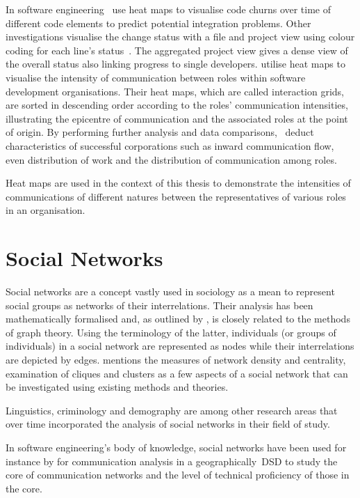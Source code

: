 In software engineering~\citet{feldt2013heatmaps} use heat maps to visualise code churns over time of different code elements to predict potential integration problems. Other investigations visualise the change status with a file and project view using colour coding for each line's status~\citep{voinea2007visualassessment}. The aggregated project view gives a dense view of the overall status also linking progress to single developers.
\citet{coplien1996patternsofprod} utilise heat maps to visualise the intensity of communication between roles within software development organisations. Their heat maps, which are called interaction grids, are sorted in descending order according to the roles' communication intensities, illustrating the epicentre of communication and the associated roles at the point of origin. By performing further analysis and data comparisons,~\citet{coplien1996patternsofprod} deduct characteristics of successful corporations such as inward communication flow, even distribution of work and the distribution of communication among roles.

Heat maps are used in the context of this thesis to demonstrate the intensities of communications of different natures between the representatives of various roles in an organisation.

\section{Social Networks}

Social networks are a concept vastly used in sociology as a mean to represent social groups as networks of their interrelations. Their analysis has been mathematically formalised and, as outlined by \citet{scott2011sn}, is closely related to the methods of graph theory. Using the terminology of the latter, individuals (or groups of individuals) in a social network are represented as nodes while their interrelations are depicted by edges. \citet{scott2011sn} mentions the measures of network density and centrality, examination of cliques and clusters as a few aspects of a social network that can be investigated using existing methods and theories.

Linguistics, criminology and demography are among other research areas that over time incorporated the analysis of social networks in their field of study. 

In software engineering's body of knowledge, social networks have been used for instance by \citet{Cataldo2008} for communication analysis in a geographically~\ac{DSD} to study the core of communication networks and the level of technical proficiency of those in the core. 

